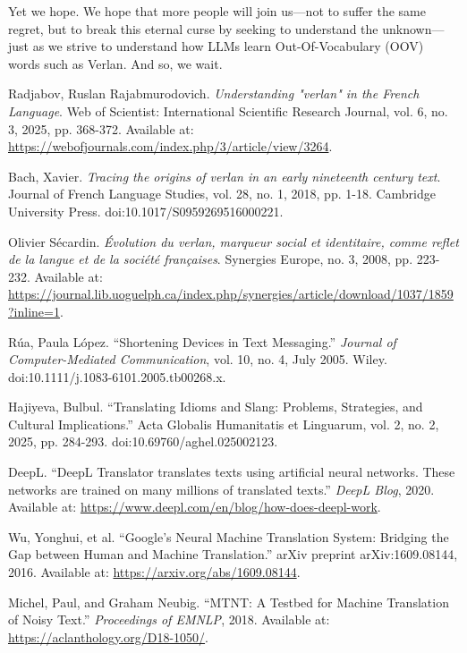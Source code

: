 \documentclass[12pt]{article}
\begin{document}
Yet we hope. 
We hope that more people will join us---not to suffer the same regret, but to break this eternal curse by seeking to understand the unknown\;---\;just as we strive to understand how LLMs learn Out-Of-Vocabulary (OOV) words such as Verlan. 
And so, we wait.
\begin{thebibliography}{9}

Radjabov, Ruslan Rajabmurodovich. \textit{Understanding "verlan" in the French Language}. 
Web of Scientist: International Scientific Research Journal, vol. 6, no. 3, 2025, pp. 368-372. 
Available at: \url{https://webofjournals.com/index.php/3/article/view/3264}.

Bach, Xavier. \textit{Tracing the origins of verlan in an early nineteenth century text}. 
Journal of French Language Studies, vol. 28, no. 1, 2018, pp. 1-18. 
Cambridge University Press. doi:10.1017/S0959269516000221.

Olivier Sécardin. \textit{Évolution du verlan, marqueur social et identitaire, comme reflet de la langue et de la société françaises}. 
Synergies Europe, no. 3, 2008, pp. 223-232. 
Available at: \url{https://journal.lib.uoguelph.ca/index.php/synergies/article/download/1037/1859?inline=1}.

Rúa, Paula López. “Shortening Devices in Text Messaging.” 
\textit{Journal of Computer-Mediated Communication}, vol. 10, no. 4, July 2005. 
Wiley. doi:10.1111/j.1083-6101.2005.tb00268.x.

Hajiyeva, Bulbul. “Translating Idioms and Slang: Problems, Strategies, and Cultural Implications.”  
Acta Globalis Humanitatis et Linguarum, vol. 2, no. 2, 2025, pp. 284-293. doi:10.69760/aghel.025002123.  

DeepL. “DeepL Translator translates texts using artificial neural networks. These networks are trained on many millions of translated texts.” 
\textit{DeepL Blog}, 2020. Available at: \url{https://www.deepl.com/en/blog/how-does-deepl-work}.

Wu, Yonghui, et al. “Google's Neural Machine Translation System: Bridging the Gap between Human and Machine Translation.” 
arXiv preprint arXiv:1609.08144, 2016. Available at: \url{https://arxiv.org/abs/1609.08144}.

Michel, Paul, and Graham Neubig. “MTNT: A Testbed for Machine Translation of Noisy Text.”
\textit{Proceedings of EMNLP}, 2018. Available at: \url{https://aclanthology.org/D18-1050/}.


\end{thebibliography}
\end{document}
